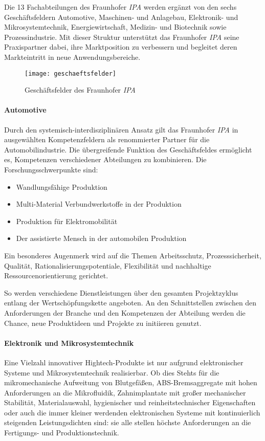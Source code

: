 Die 13 Fachabteilungen des Fraunhofer \emph{IPA} werden ergänzt von den sechs Geschäftsfeldern Automotive, Maschinen- und
Anlagebau, Elektronik- und Mikrosystemtechnik, Energiewirtschaft, Medizin- und Biotechnik sowie Prozessindustrie.
Mit dieser Struktur unterstützt das Fraunhofer \emph{IPA} seine Praxispartner dabei, ihre Marktposition zu verbessern
und begleitet deren Markteintritt in neue Anwendungsbereiche.


\begin{figure}[h]
    \centering
    \texttt{[image: geschaeftsfelder]}
   \caption{Geschäftsfelder des Fraunhofer \emph{IPA}}
    \label{img:geschaeftsfelder}
\end{figure}
\paragraph{Automotive}
Durch den systemisch-interdisziplinären Ansatz gilt das Fraunhofer \emph{IPA} in ausgewählten Kompetenzfeldern als renommierter Partner für die Automobilindustrie.
Die übergreifende Funktion des Geschäftsfeldes ermöglicht es, Kompetenzen verschiedener Abteilungen zu kombinieren.
Die Forschungsschwerpunkte sind:

\begin{itemize}
    \item Wandlungsfähige Produktion
    \item Multi-Material Verbundwerkstoffe in der Produktion
    \item Produktion für Elektromobilität
    \item Der assistierte Mensch in der automobilen Produktion
\end{itemize}

Ein besonderes Augenmerk wird auf die Themen Arbeitsschutz, Prozesssicherheit, Qualität, Rationalisierungspotentiale, Flexibilität und nachhaltige Ressourcenorientierung gerichtet.

So werden verschiedene Dienstleistungen über den gesamten Projektzyklus entlang der Wertschöpfungskette angeboten.
An den Schnittstellen zwischen den Anforderungen der Branche und den Kompetenzen der Abteilung werden die Chance, neue Produktideen und Projekte zu initiieren genutzt.
\paragraph{Elektronik und Mikrosystemtechnik}
Eine Vielzahl innovativer Hightech-Produkte ist nur aufgrund elektronischer Systeme und Mikrosystemtechnik realisierbar.
Ob dies Stehts für die mikromechanische Aufweitung von Blutgefäßen, ABS-Bremsaggregate mit hohen Anforderungen an die Mikrofluidik, Zahnimplantate mit großer mechanischer Stabilität,
Materialauswahl, hygienischer und reinheitstechnischer Eigenschaften oder auch die immer kleiner werdenden elektronischen Systeme mit kontinuierlich steigenden Leistungsdichten sind:
sie alle stellen höchste Anforderungen an die Fertigungs- und Produktionstechnik.

